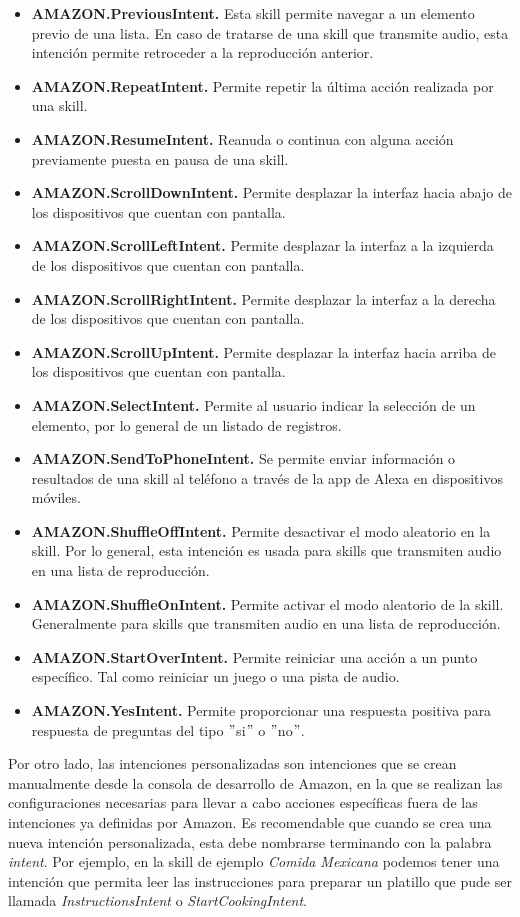 \begin{itemize}
  \item \textbf{AMAZON.PreviousIntent.} Esta skill permite navegar a un elemento previo de una lista. En caso de tratarse de una skill que transmite audio, esta intención permite retroceder a la reproducción anterior.
  \item \textbf{AMAZON.RepeatIntent.} Permite repetir la última acción realizada por una skill.
  \item \textbf{AMAZON.ResumeIntent.} Reanuda o continua con alguna acción previamente puesta en pausa de una skill.
  \item \textbf{AMAZON.ScrollDownIntent.} Permite desplazar la interfaz hacia abajo de los dispositivos que cuentan con pantalla.
  \item \textbf{AMAZON.ScrollLeftIntent.} Permite desplazar la interfaz a la izquierda de los dispositivos que cuentan con pantalla.
  \item \textbf{AMAZON.ScrollRightIntent.} Permite desplazar la interfaz a la derecha de los dispositivos que cuentan con pantalla.
  \item \textbf{AMAZON.ScrollUpIntent.} Permite desplazar la interfaz hacia arriba de los dispositivos que cuentan con pantalla.
  \item \textbf{AMAZON.SelectIntent.} Permite al usuario indicar la selección de un elemento, por lo general de un listado de registros.
  \item \textbf{AMAZON.SendToPhoneIntent.} Se permite enviar información o resultados de una skill al teléfono a través de la app de Alexa en dispositivos móviles.
  \item \textbf{AMAZON.ShuffleOffIntent.} Permite desactivar el modo aleatorio en la skill. Por lo general, esta intención es usada para skills que transmiten audio en una lista de reproducción.
  \item \textbf{AMAZON.ShuffleOnIntent.} Permite activar el modo aleatorio de la skill. Generalmente para skills que transmiten audio en una lista de reproducción.
  \item \textbf{AMAZON.StartOverIntent.} Permite reiniciar una acción a un punto específico. Tal como reiniciar un juego o una pista de audio.
  \item \textbf{AMAZON.YesIntent.} Permite proporcionar una respuesta positiva para respuesta de preguntas del tipo $"$si$"$ o $"$no$"$.
\end{itemize}

Por otro lado, las intenciones personalizadas son intenciones que se crean manualmente desde la consola de desarrollo de Amazon, en la que se realizan las configuraciones necesarias para llevar a cabo acciones específicas fuera de las intenciones ya definidas por Amazon. Es recomendable que cuando se crea una nueva intención personalizada, esta debe nombrarse terminando con la palabra \textit{intent}. Por ejemplo, en la skill de ejemplo \textit{Comida Mexicana} podemos tener una intención que permita leer las instrucciones para preparar un platillo que pude ser llamada \textit{InstructionsIntent} o \textit{StartCookingIntent}.


